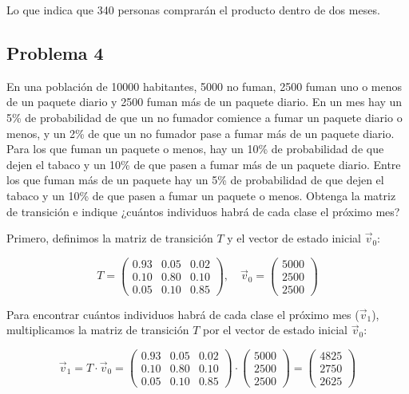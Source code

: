 \documentclass{article}
\begin{document}
Lo que indica que 340 personas comprarán el producto dentro de dos meses.


\subsection*{Problema 4}

En una población de 10000 habitantes, 5000 no fuman, 2500 fuman uno o menos de un paquete diario y 2500 fuman más de un paquete diario. En un mes hay un 5\% de probabilidad de que un no fumador comience a fumar un paquete diario o menos, y un 2\% de que un no fumador pase a fumar más de un paquete diario. Para los que fuman un paquete o menos, hay un 10\% de probabilidad de que dejen el tabaco y un 10\% de que pasen a fumar más de un paquete diario. Entre los que fuman más de un paquete hay un 5\% de probabilidad de que dejen el tabaco y un 10\% de que pasen a fumar un paquete o menos. Obtenga la matriz de transición e indique ¿cuántos individuos habrá de cada clase el próximo mes?

Primero, definimos la matriz de transición \(T\) y el vector de estado inicial \(\vec{v}_0\):

\[
    T = \begin{pmatrix}
        0.93 & 0.05 & 0.02 \\
        0.10 & 0.80 & 0.10 \\
        0.05 & 0.10 & 0.85
    \end{pmatrix},
    \quad
    \vec{v}_0 = \begin{pmatrix}
        5000 \\
        2500 \\
        2500
    \end{pmatrix}
\]

Para encontrar cuántos individuos habrá de cada clase el próximo mes (\(\vec{v}_1\)), multiplicamos la matriz de transición \(T\) por el vector de estado inicial \(\vec{v}_0\):

\[
    \vec{v}_1 = T \cdot \vec{v}_0 = \begin{pmatrix}
        0.93 & 0.05 & 0.02 \\
        0.10 & 0.80 & 0.10 \\
        0.05 & 0.10 & 0.85
    \end{pmatrix}
    \cdot
    \begin{pmatrix}
        5000 \\
        2500 \\
        2500
    \end{pmatrix}
    =
    \begin{pmatrix}
        4825 \\
        2750 \\
        2625
    \end{pmatrix}
\]
\end{document}
